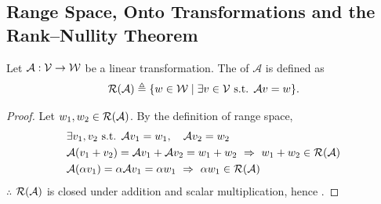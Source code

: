 \subsection{Range Space, Onto Transformations and the Rank--Nullity Theorem}\label{ss:range}

\begin{definition}
Let $\mathcal{A}:\mathcal{V}\to\mathcal{W}$ be a linear transformation. The  of $\mathcal{A}$ is defined as
\[
\mathcal{R}(\mathcal{A})\triangleq\{w\in\mathcal{W}\mid \exists v\in\mathcal{V} \text{ s.t. } \mathcal{A}v=w\}.
\]
\end{definition}

\begin{claim}
\end{claim}
\begin{proof}
Let $w_1,w_2\in\mathcal{R}(\mathcal{A})$. By the definition of range space,
\begin{align*}
&\exists v_1,v_2 \text{ s.t. } \mathcal{A}v_1=w_1, \quad \mathcal{A}v_2=w_2\\
&\mathcal{A}(v_1+v_2)=\mathcal{A}v_1+\mathcal{A}v_2=w_1+w_2 \ \Rightarrow\ w_1+w_2\in\Range(\mathcal{A})\\
&\mathcal{A}(\alpha v_1)=\alpha\mathcal{A}v_1=\alpha w_1 \ \Rightarrow\ \alpha w_1\in\Range(\mathcal{A})
\end{align*}
$\therefore$ $\mathcal{R}(\mathcal{A})$ is closed under addition and scalar multiplication, hence .
\end{proof}

